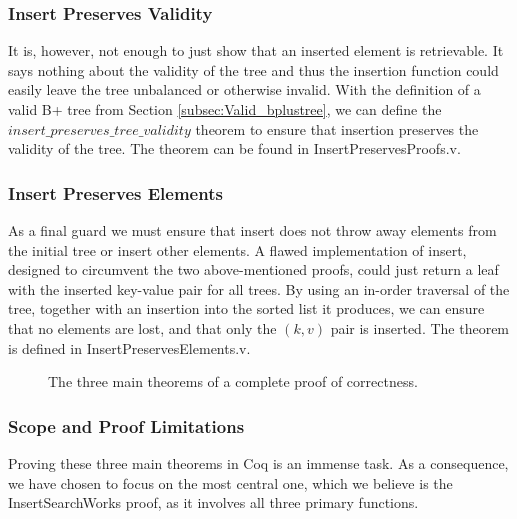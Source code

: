 \subsubsection{Insert Preserves Validity}
It is, however, not enough to just show that an inserted element is retrievable. It says nothing about the validity of the tree and thus the insertion function could easily leave the tree unbalanced or otherwise invalid. With the definition of a valid B+ tree from Section \ref{subsec:Valid_bplustree}, we can define the $insert\_preserves\_tree\_validity$ theorem to ensure that insertion preserves the validity of the tree. The theorem can be found in InsertPreservesProofs.v.

\subsubsection{Insert Preserves Elements}
As a final guard we must ensure that insert does not throw away elements from the initial tree or insert other elements. A flawed implementation of insert, designed to circumvent the two above-mentioned proofs, could just return a leaf with the inserted key-value pair for all trees. By using an in-order traversal of the tree, together with an insertion into the sorted list it produces, we can ensure that no elements are lost, and that only the $(k, v)$ pair is inserted. The theorem is defined in InsertPreservesElements.v.

\begin{figure}
\centering

\caption{The three main theorems of a complete proof of correctness.}
\label{fig:three_main_proofs}
\end{figure}

\subsubsection{Scope and Proof Limitations}
Proving these three main theorems in Coq is an immense task. As a consequence, we have chosen to focus on the most central one, which we believe is the InsertSearchWorks proof, as it involves all three primary functions.

